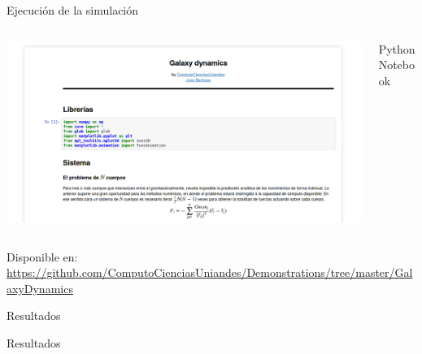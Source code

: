 \documentclass{beamer}
\begin{document}
\begin{frame}{Ejecuci\'on de la simulaci\'on}
	\begin{columns}
		\begin{column}{0.75\textwidth}
			\includegraphics[height=0.5\textheight]{sources/images/screen.png}
		\end{column}
		\begin{column}{0.25\textwidth}
			Python Notebook
		\end{column}
	\end{columns}
	Disponible en:
	\tiny
	\url{https://github.com/ComputoCienciasUniandes/Demonstrations/tree/master/GalaxyDynamics}
	\normalsize
\end{frame}
\begin{frame}{Resultados}
	\centering
	\\
\end{frame}
\begin{frame}{Resultados}
	\centering
	\\
\end{frame}
\end{document}
